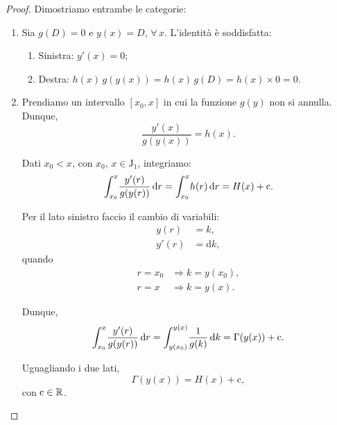 \documentclass[../../analisi2]{subfiles}
\begin{document}
        \begin{proof}
            Dimostriamo entrambe le categorie:
            \begin{enumerate}
                \item Sia \(g(D) = 0\) e \(y(x) = D\), \(\forall \, x\).
                    L'identità è soddisfatta:
                    \begin{enumerate}
                        \item Sinistra: \(y'(x) = 0\);
                        \item Destra: \(h(x) \, g(y(x)) = h(x) \, g(D) = h(x) \times 0 = 0\).
                    \end{enumerate}
                \item Prendiamo un intervallo \([x_0, x]\) in cui la funzione \(g(y)\) non si annulla. Dunque,
                    \[
                        \frac{y'(x)}{g(y(x))} = h(x).
                    \]

                    Dati \(x_0 < x\), con \(x_0, \, x \in \mathrm{J}_1\), integriamo:
                    \[
                        \int_{x_0}^{x} \! \frac{y'(r)}{g(y(r))} \, \mathrm{d}r = \int_{x_0}^{x} \! h(r) \, \mathrm{d}r = H(x) + \mathrm{c}.
                    \]

                    Per il lato sinistro faccio il cambio di variabili:
                    \begin{align*}
                        y(r) &= k,\\
                        y'(r) &= \mathrm{d}k,
                    \end{align*}
                    quando
                    \begin{align*}
                        r = x_0 &\Rightarrow k = y(x_0),\\
                        r = x &\Rightarrow k = y(x).
                    \end{align*}

                    Dunque,
                    \[
                        \int_{x_0}^{x} \! \frac{y'(r)}{g(y(r))} \, \mathrm{d}r = \int_{y(x_0)}^{y(x)} \! \frac{1}{g(k)} \, \mathrm{d}k = \Gamma(y(x)) + \mathrm{c}.
                    \]

                    Uguagliando i due lati,
                    \[
                        \Gamma(y(x)) = H(x) + \mathrm{c},
                    \]
                    con \(\mathrm{c} \in \mathbb{R}\).
            \end{enumerate}
        \end{proof}
            
\end{document}
